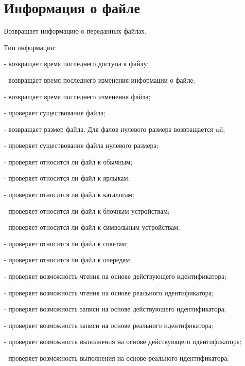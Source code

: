 \section{Информация о файле}

\begin{methodlist}
  Возвращает информацию о переданных файлах.

  \begin{keylist}{Тип информации:}
    
      - возвращает время последнего доступа к файлу;
    
     - возвращает время последнего изменения информации о файле; 
    
     - возвращает время последнего изменения файла;

     - проверяет существование файла;
    
     - возвращает размер файла. Для фалов нулевого размера возвращается nil;
    
     - проверяет существование файла нулевого размера;
    
     - проверяет относится ли файл к обычным;
    
     - проверяет относится ли файл к ярлыкам;
    
     - проверяет относится ли файл к каталогам;
    
     - проверяет относится ли файл к блочным устройствам;
    
     - проверяет относится ли файл к символьным устройствам;
    
     - проверяет относится ли файл к сокетам;
    
     - проверяет относится ли файл к очередям;
    
     - проверяет возможность чтения на основе действующего идентификатора; 
    
     - проверяет возможность чтения на основе реального идентификатора; 
    
     - проверяет возможность записи на основе действующего идентификатора;
    
     - проверяет возможность записи на основе реального идентификатора; 
    
     - проверяет возможность выполнения на основе действующего идентификатора; 
    
     - проверяет возможность выполнения на основе реального идентификатора; 
    

\end{keylist}
\end{methodlist}
